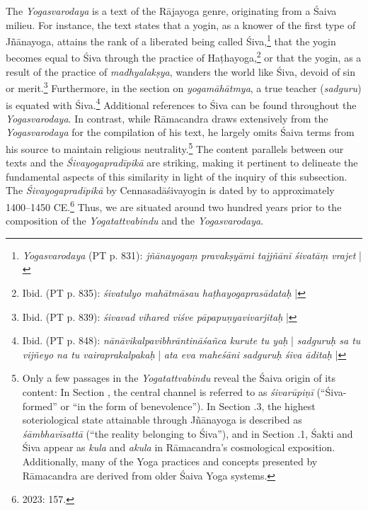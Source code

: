 The \textit{Yogasvarodaya} is a text of the Rājayoga genre, originating from a Śaiva milieu. For instance, the text states that a yogin, as a knower of the first type of Jñānayoga, attains the rank of a liberated being called Śiva,\footnote{\textit{Yogasvarodaya} (PT p. 831): \textit{jñānayogaṃ pravakṣyāmi tajjñānī śivatāṃ vrajet} |} that the yogin becomes equal to Śiva through the practice of Haṭhayoga,\footnote{Ibid. (PT p. 835): \textit{śivatulyo mahātmāsau haṭhayogaprasādataḥ} |} or that the yogin, as a result of the practice of \textit{madhyalakṣya}, wanders the world like Śiva, devoid of sin or merit.\footnote{Ibid. (PT p. 839): \textit{śivavad vihared viśve pāpapuṇyavivarjitaḥ} |} Furthermore, in the section on \textit{yogamāhātmya}, a true teacher (\textit{sadguru}) is equated with Śiva.\footnote{Ibid. (PT p. 848): \textit{nānāvikalpavibhrāntināśañca kurute tu yaḥ} | \textit{sadguruḥ sa tu vijñeyo na tu vairaprakalpakaḥ} | \textit{ata eva maheśāni sadguruḥ śiva āditaḥ} |} Additional references to Śiva can be found throughout the \textit{Yogasvarodaya}. In contrast, while Rāmacandra draws extensively from the \textit{Yogasvarodaya} for the compilation of his text, he largely omits Śaiva terms from his source to maintain religious neutrality.\footnote{Only a few passages in the \textit{Yogatattvabindu} reveal the Śaiva origin of its content: In Section , the central channel is referred to as \textit{śivarūpiṇī} (``Śiva-formed'' or ``in the form of benevolence''). In Section .3, the highest soteriological state attainable through Jñānayoga is described as \textit{śāmbhavīsattā} (``the reality belonging to Śiva''), and in Section .1, Śakti and Śiva appear as \textit{kula} and \textit{akula} in Rāmacandra’s cosmological exposition. Additionally, many of the Yoga practices and concepts presented by Rāmacandra are derived from older Śaiva Yoga systems.} The content parallels between our texts and the \textit{Śivayogapradīpikā} are striking, making it pertinent to delineate the fundamental aspects of this similarity in light of the inquiry of this subsection. The \textit{Śivayogapradīpikā} by Cennasadāśivayogin is dated by \citeauthor{powell2023} to approximately 1400–1450 CE.\footnote{\citeauthor{powell2023} 2023: 157.} Thus, we are situated around two hundred years prior to the composition of the \textit{Yogatattvabindu} and the \textit{Yogasvarodaya}.

